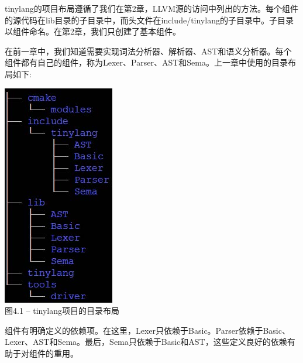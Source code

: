 tinylang的项目布局遵循了我们在第2章，LLVM源的访问中列出的方法。每个组件的源代码在lib目录的子目录中，而头文件在include/tinylang的子目录中。子目录以组件命名。在第2章，我们只创建了基本组件。\par

在前一章中，我们知道需要实现词法分析器、解析器、AST和语义分析器。每个组件都有自己的组件，称为Lexer、Parser、AST和Sema。上一章中使用的目录布局如下:\par

\hspace*{\fill} \par %
\begin{center}
	\includegraphics{content/2/chapter4/images/1.jpg}\\
	图4.1 – tinylang项目的目录布局
\end{center}

组件有明确定义的依赖项。在这里，Lexer只依赖于Basic。Parser依赖于Basic、Lexer、AST和Sema。最后，Sema只依赖于Basic和AST，这些定义良好的依赖有助于对组件的重用。\par


